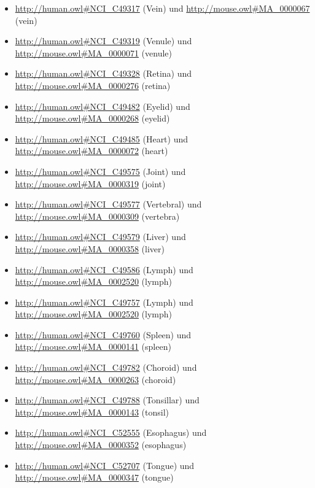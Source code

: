 \begin{itemize}
	\item \url{http://human.owl#NCI_C49317} (Vein\textunderscoreEndothelium) und \url{http://mouse.owl#MA_0000067} (vein)
	\item \url{http://human.owl#NCI_C49319} (Venule\textunderscoreEndothelium) und \url{http://mouse.owl#MA_0000071} (venule)
	\item \url{http://human.owl#NCI_C49328} (Retina\textunderscoreLayer) und \url{http://mouse.owl#MA_0000276} (retina)
	\item \url{http://human.owl#NCI_C49482} (Eyelid\textunderscoreConnective\textunderscoreTissue) und \url{http://mouse.owl#MA_0000268} (eyelid)
	\item \url{http://human.owl#NCI_C49485} (Heart\textunderscoreSeptum) und \url{http://mouse.owl#MA_0000072} (heart)
	\item \url{http://human.owl#NCI_C49575} (Joint\textunderscoreof\textunderscorethe\textunderscoreRib) und \url{http://mouse.owl#MA_0000319} (joint)
	\item \url{http://human.owl#NCI_C49577} (Vertebral\textunderscoreJoint) und \url{http://mouse.owl#MA_0000309} (vertebra)
	\item \url{http://human.owl#NCI_C49579} (Liver\textunderscoreLobe) und \url{http://mouse.owl#MA_0000358} (liver)
	\item \url{http://human.owl#NCI_C49586} (Lymph\textunderscoreNode\textunderscoreLymphoid\textunderscoreFollicle) und \url{http://mouse.owl#MA_0002520} (lymph)
	\item \url{http://human.owl#NCI_C49757} (Lymph\textunderscoreNode\textunderscoreGerminal\textunderscoreCenter) und \url{http://mouse.owl#MA_0002520} (lymph)
	\item \url{http://human.owl#NCI_C49760} (Spleen\textunderscoreGerminal\textunderscoreCenter) und \url{http://mouse.owl#MA_0000141} (spleen)
	\item \url{http://human.owl#NCI_C49782} (Choroid\textunderscorePlexus\textunderscoreof\textunderscorethe\textunderscoreThird\textunderscoreVentricle) und \url{http://mouse.owl#MA_0000263} (choroid)
	\item \url{http://human.owl#NCI_C49788} (Tonsillar\textunderscoreCapsule) und \url{http://mouse.owl#MA_0000143} (tonsil)
	\item \url{http://human.owl#NCI_C52555} (Esophagus\textunderscoreSecretion) und \url{http://mouse.owl#MA_0000352} (esophagus)
	\item \url{http://human.owl#NCI_C52707} (Tongue\textunderscoreMuscle) und \url{http://mouse.owl#MA_0000347} (tongue)

\end{itemize}
